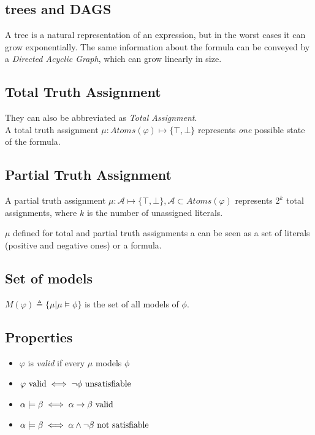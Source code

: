 \documentclass{article}
\begin{document}
\subsection*{trees and DAGS}
A tree is a natural representation of an expression, but in the worst cases it can grow exponentially. The same information about the formula can be conveyed by a \textit{Directed Acyclic Graph}, which can grow linearly in size.

\subsection*{Total Truth Assignment}
They can also be abbreviated as \textit{Total Assignment}.\\
A total truth assignment $\mu: Atoms(\varphi)\mapsto\{\top,\bot\}$ represents \textit{one} possible state of the formula.

\subsection*{Partial Truth Assignment}
A partial truth assignment $\mu: \mathcal A \mapsto\{\top,\bot\}, \mathcal A\subset Atoms(\varphi)$ represents $2^k$ total assignments, where $k$ is the number of unassigned literals.

$\mu$ defined for total and partial truth assignments a can be seen as a set of literals (positive and negative ones) or a formula.

\subsection*{Set of models}
$M(\varphi) \triangleq \{\mu | \mu\models\phi\}$ is the set of all models of $\phi$.

\subsection*{Properties}
\begin{itemize}
    \item $\varphi$ is \textit{valid} if every $\mu$ models $\phi$
    \item $\varphi\ \text{valid} \iff \neg\phi\text{ unsatisfiable}$
    \item $\alpha\models\beta \iff \alpha\to\beta\text{ valid}$
    \item $\alpha\models\beta \iff \alpha\wedge\neg\beta\ \text{not satisfiable}$\reversemarginpar{}
\end{itemize}
\end{document}
